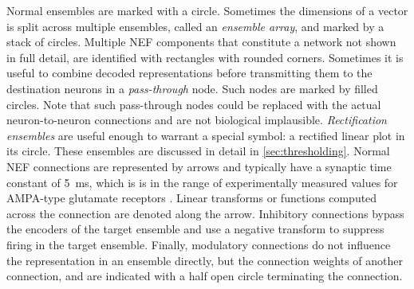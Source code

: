 Normal ensembles are marked with a circle.
Sometimes the dimensions of a vector is split across multiple ensembles, called an \emph{ensemble array}, and marked by a stack of circles.
Multiple NEF components that constitute a network not shown in full detail, are identified with rectangles with rounded corners.
Sometimes it is useful to combine decoded representations before transmitting them to the destination neurons in a \emph{pass-through} node.
Such nodes are marked by filled circles.
Note that such pass-through nodes could be replaced with the actual neuron-to-neuron connections and are not biological implausible.
\emph{Rectification ensembles} are useful enough to warrant a special symbol: a rectified linear plot in its circle.
These ensembles are discussed in detail in \cref{sec:thresholding}.
Normal NEF connections are represented by arrows and typically have a synaptic time constant of \SI{5}{\milli\second}, which is is in the range of experimentally measured values for AMPA-type glutamate receptors \parencite{jonas1993,spruston1995-1}.
Linear transforms or functions computed across the connection are denoted along the arrow.
Inhibitory connections bypass the encoders of the target ensemble and use a negative transform to suppress firing in the target ensemble.
Finally, modulatory connections do not influence the representation in an ensemble directly, but the connection weights of another connection, and are indicated with a half open circle terminating the connection.


